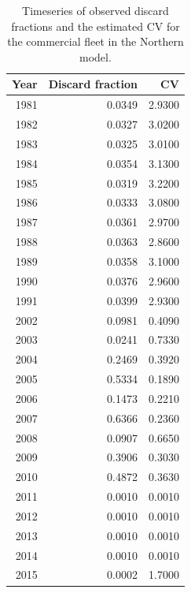 \documentclass[12pt,]{article}
\begin{document}
\begin{table}[ht]
\centering
\caption{Timeseries of observed discard fractions and the estimated CV for the commercial fleet in the Northern model.} 
\label{tab:Northern_discard}
\begin{tabular}{rrr}
  \hline
Year & Discard fraction & CV \\ 
  \hline
 1981 & 0.0349 & 2.9300 \\ 
   1982 & 0.0327 & 3.0200 \\ 
   1983 & 0.0325 & 3.0100 \\ 
   1984 & 0.0354 & 3.1300 \\ 
   1985 & 0.0319 & 3.2200 \\ 
   1986 & 0.0333 & 3.0800 \\ 
   1987 & 0.0361 & 2.9700 \\ 
   1988 & 0.0363 & 2.8600 \\ 
   1989 & 0.0358 & 3.1000 \\ 
   1990 & 0.0376 & 2.9600 \\ 
   1991 & 0.0399 & 2.9300 \\ 
   2002 & 0.0981 & 0.4090 \\ 
   2003 & 0.0241 & 0.7330 \\ 
   2004 & 0.2469 & 0.3920 \\ 
   2005 & 0.5334 & 0.1890 \\ 
   2006 & 0.1473 & 0.2210 \\ 
   2007 & 0.6366 & 0.2360 \\ 
   2008 & 0.0907 & 0.6650 \\ 
   2009 & 0.3906 & 0.3030 \\ 
   2010 & 0.4872 & 0.3630 \\ 
   2011 & 0.0010 & 0.0010 \\ 
   2012 & 0.0010 & 0.0010 \\ 
   2013 & 0.0010 & 0.0010 \\ 
   2014 & 0.0010 & 0.0010 \\ 
   2015 & 0.0002 & 1.7000 \\ 
   \hline
\end{tabular}
\end{table}\newpage
\end{document}
